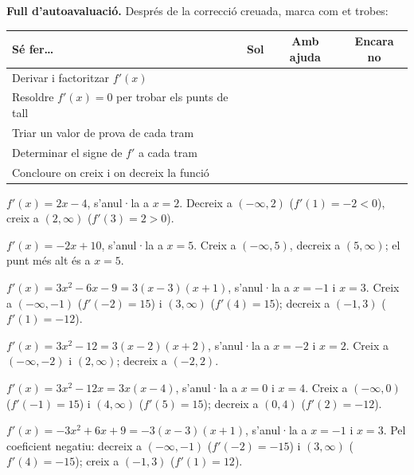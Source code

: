 \begin{idea}
\textbf{Full d'autoavaluació.} Després de la correcció creuada, marca com et trobes:
\begin{center}
\renewcommand{\arraystretch}{1.4}
\begin{tabular}{p{8.4cm} c c c}
\toprule
\textbf{Sé fer\dots} & \textbf{Sol} & \textbf{Amb ajuda} & \textbf{Encara no} \\
\midrule
Derivar i factoritzar $f'(x)$ & & & \\
Resoldre $f'(x)=0$ per trobar els punts de tall & & & \\
Triar un valor de prova de cada tram & & & \\
Determinar el signe de $f'$ a cada tram & & & \\
Concloure on creix i on decreix la funció & & & \\
\bottomrule
\end{tabular}
\end{center}
\end{idea}

\begin{solucions}
\begin{sollist}
  \item $f'(x)=2x-4$, s'anul·la a $x=2$. Decreix a $(-\infty,2)$ ($f'(1)=-2<0$), creix
        a $(2,\infty)$ ($f'(3)=2>0$).
  \item $f'(x)=-2x+10$, s'anul·la a $x=5$. Creix a $(-\infty,5)$, decreix a
        $(5,\infty)$; el punt més alt és a $x=5$.
  \item $f'(x)=3x^2-6x-9=3(x-3)(x+1)$, s'anul·la a $x=-1$ i $x=3$. Creix a
        $(-\infty,-1)$ ($f'(-2)=15$) i $(3,\infty)$ ($f'(4)=15$); decreix a $(-1,3)$
        ($f'(1)=-12$).
  \item $f'(x)=3x^2-12=3(x-2)(x+2)$, s'anul·la a $x=-2$ i $x=2$. Creix a $(-\infty,-2)$
        i $(2,\infty)$; decreix a $(-2,2)$.
  \item $f'(x)=3x^2-12x=3x(x-4)$, s'anul·la a $x=0$ i $x=4$. Creix a $(-\infty,0)$
        ($f'(-1)=15$) i $(4,\infty)$ ($f'(5)=15$); decreix a $(0,4)$ ($f'(2)=-12$).
  \item $f'(x)=-3x^2+6x+9=-3(x-3)(x+1)$, s'anul·la a $x=-1$ i $x=3$. Pel coeficient
        negatiu: decreix a $(-\infty,-1)$ ($f'(-2)=-15$) i $(3,\infty)$ ($f'(4)=-15$);
        creix a $(-1,3)$ ($f'(1)=12$).
\end{sollist}
\end{solucions}
